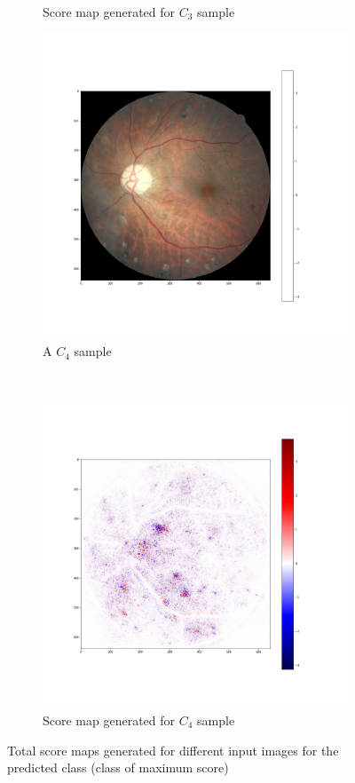 \documentclass[preprint]{elsarticle}
\theoremstyle{definition} %
\theoremstyle{remark}
\begin{document}
\begin{figure}[h!]
\begin{subfigure}[b]{0.45\textwidth}
		\caption{Score map generated for $C_3$ sample}
	\end{subfigure}
	\begin{subfigure}[b]{0.45\textwidth}
		\includegraphics[width=\textwidth]{figures/class_maps/14844_left_1.png}
		\caption{A $C_4$ sample}
	\end{subfigure}~
	\begin{subfigure}[b]{0.45\textwidth}
		\includegraphics[width=\textwidth]{figures/class_maps/14844_left_2.png}
		\caption{Score map generated for $C_4$ sample}
	\end{subfigure}

	\caption{Total score maps generated for different input images for the predicted class (class of maximum score)}
	\label{fig:score_samples}
\end{figure}
\end{document}
